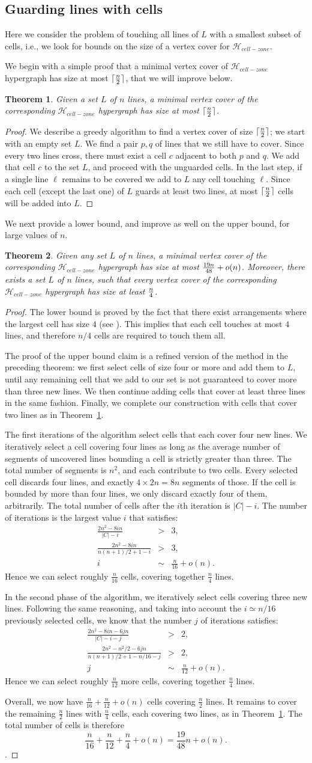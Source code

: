 \documentclass[11pt,a4paper]{article}
\newtheorem{theorem}{Theorem}
\newcommand{\Hcellzone}{{\mathcal H}_{cell-zone}}
\newcommand{\sholong}[2]{#2}
\newcommand{\proofguardwithcells}{The first iterations of the algorithm select cells that each cover four new lines. 
We iteratively select a cell covering four lines as long as the average number of segments of uncovered lines bounding a cell is strictly greater than three. The total number of segments is $n^2$, and each contribute to two cells. Every selected cell discards four lines, and exactly $4\times 2n=8n$ segments of those. If the cell is bounded by more than four lines, we only discard exactly four of them, arbitrarily. The total number of cells after the $i$th iteration is $|C|-i$. The number of iterations is the largest value $i$ that satisfies:
\begin{eqnarray*}
\frac{2n^2 - 8in}{|C|-i} & > & 3, \\
\frac{2n^2 - 8in}{n(n+1)/2 +1 -i} & > & 3, \\
i & \sim & \frac n{16} +o(n) .
\end{eqnarray*}
Hence we can select roughly $\frac n{16}$ cells, covering together $\frac n4$ lines.

In the second phase of the algorithm, we iteratively select cells covering three new lines. Following the same reasoning, and taking into account the $i\simeq n/16$ previously selected cells, we know that the number $j$ of iterations satisfies:
\begin{eqnarray*}
\frac{2n^2 - 8in - 6jn}{|C| -i -j} & > & 2, \\
\frac{2n^2 - n^2/2 - 6jn}{n(n+1)/2 +1 -n/16 -j} & > & 2, \\
j & \sim & \frac n{12} +o(n).
\end{eqnarray*}
Hence we can select roughly $\frac n{12}$ more cells, covering together $\frac n4$ lines.

Overall, we now have $\frac n{16}+\frac n{12} + o(n)$ cells covering $\frac n2$ lines. It remains to cover the remaining $\frac n2$ lines with $\frac n4$ cells, each covering two lines, as in Theorem~\ref{warmup:guardwithcells}. The total number of cells is therefore
\begin{equation*}
\frac n{16}+\frac n{12} + \frac n4 + o(n) = \frac{19}{48} n +o(n).
\end{equation*}}
\begin{document}
\subsection{Guarding lines with cells}

Here we consider the problem of touching all lines of $L$ with a smallest subset of cells, i.e., we look for bounds on the size of a vertex cover for $\Hcellzone$.



We begin with a simple proof that a minimal vertex cover of $\Hcellzone$ hypergraph has size at most $\lceil{n \over 2}\rceil$, that we will improve below.
\begin{theorem}\label{warmup:guardwithcells}
Given a set $L$ of $n$ lines, a minimal vertex cover of the corresponding $\Hcellzone$ hypergraph has size at most $\lceil{n \over 2}\rceil$.
\end{theorem}
\begin{proof}
We describe a greedy algorithm to find a vertex cover of size $\lceil{n \over 2}\rceil$; we start with an empty set $L$. We find a pair $p,q$ of lines that we still have to cover. Since every two lines cross, there must exist a cell $c$ adjacent to both $p$ and $q$. We add that cell $c$ to the set $L$, and proceed with the unguarded cells. In the last step, if a single line $\ell$ remains to be covered we add  to $L$ any cell touching $\ell$. Since each cell (except the last one) of $L$ guards at least two lines, at most $\lceil{n \over 2}\rceil$ cells will be added into $L$.
\end{proof}

We next provide a lower bound, and improve as well on the upper bound, for large values of $n$. 
\begin{theorem}\label{guardwithcells}
Given any set $L$ of $n$ lines, a minimal vertex cover of the corresponding $\Hcellzone$ hypergraph has size at most ${19n \over 48} +o(n)$. Moreover, there exists a set $L$ of $n$ lines, such that every vertex cover of the corresponding $\Hcellzone$ hypergraph has size at least ${n \over 4}$.
\end{theorem}
\begin{proof}
The lower bound is proved by the fact that there exist arrangements where the largest cell has size $4$ (see \cite{LLMSU07}). This implies that each cell touches at most $4$ lines, and therefore $n/4$ cells are required to touch them all.

The proof of the upper bound claim is a refined version of the method in the preceding theorem: we
first select cells of size four or more and add them to $L$, until any remaining cell that we add to our set is not guaranteed to cover more than three new lines. We then continue adding cells that cover at least three lines in the same fashion. Finally, we complete our construction with cells that cover two lines as in Theorem~\ref{warmup:guardwithcells}. \sholong{Details can be found in the Appendix}{

\proofguardwithcells}.
\end{proof}
\end{document}
